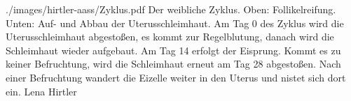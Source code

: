 % 

{}
{}
{}
{./images/hirtler-aass/Zyklus.pdf}
{Der weibliche Zyklus. Oben:
Follikelreifung. Unten: Auf- und Abbau der
Uterusschleimhaut. Am Tag 0 des Zyklus wird die
Uterusschleimhaut abgestoßen, es kommt zur Regelblutung,
danach wird die Schleimhaut wieder aufgebaut. Am Tag 14
erfolgt der Eisprung.
Kommt es zu keiner Befruchtung, wird die Schleimhaut erneut
am Tag 28 abgestoßen. Nach einer Befruchtung wandert die
Eizelle weiter in den Uterus und nistet sich dort ein.}
{Lena Hirtler}


\ChapterEnd